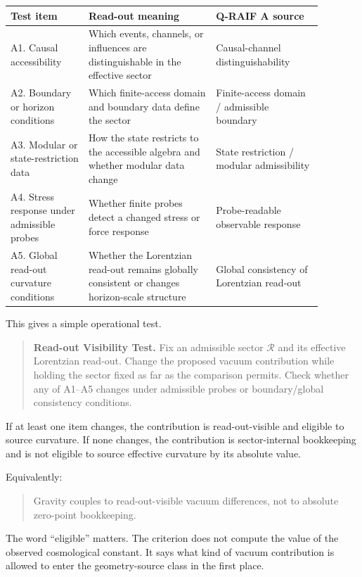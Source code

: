 \documentclass[12pt,a4paper]{article}
\theoremstyle{definition}
\theoremstyle{remark}
\begin{document}
\begin{center}
\begin{tabular}{P{0.22\linewidth}P{0.36\linewidth}P{0.30\linewidth}}
\toprule
\textbf{Test item} & \textbf{Read-out meaning} & \textbf{Q-RAIF A source} \\
\midrule
A1. Causal accessibility & Which events, channels, or influences are distinguishable in the effective sector & Causal-channel distinguishability \\
A2. Boundary or horizon conditions & Which finite-access domain and boundary data define the sector & Finite-access domain / admissible boundary \\
A3. Modular or state-restriction data & How the state restricts to the accessible algebra and whether modular data change & State restriction / modular admissibility \\
A4. Stress response under admissible probes & Whether finite probes detect a changed stress or force response & Probe-readable observable response \\
A5. Global read-out curvature conditions & Whether the Lorentzian read-out remains globally consistent or changes horizon-scale structure & Global consistency of Lorentzian read-out \\
\bottomrule
\end{tabular}
\end{center}

This gives a simple operational test.

\begin{quote}
\textbf{Read-out Visibility Test.} Fix an admissible sector $\mathcal{R}$ and its effective Lorentzian read-out. Change the proposed vacuum contribution while holding the sector fixed as far as the comparison permits. Check whether any of A1--A5 changes under admissible probes or boundary/global consistency conditions.
\end{quote}

If at least one item changes, the contribution is read-out-visible and eligible to source curvature. If none changes, the contribution is sector-internal bookkeeping and is not eligible to source effective curvature by its absolute value.

Equivalently:

\begin{quote}
Gravity couples to read-out-visible vacuum differences, not to absolute zero-point bookkeeping.
\end{quote}

The word ``eligible'' matters. The criterion does not compute the value of the observed cosmological constant. It says what kind of vacuum contribution is allowed to enter the geometry-source class in the first place.
\end{document}
